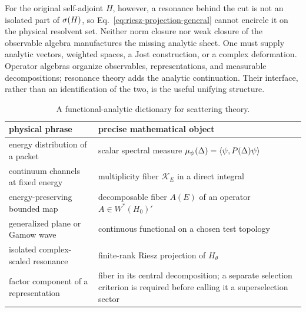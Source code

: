For the original self-adjoint $H$, however, a resonance behind the cut is not
an isolated part of $\sigma(H)$, so Eq.~\eqref{eq:riesz-projection-general}
cannot encircle it on the physical resolvent set.  Neither norm closure nor
weak closure of the observable algebra manufactures the missing analytic
sheet.  One must supply analytic vectors, weighted spaces, a Jost construction,
or a complex deformation.  Operator algebras organize observables,
representations, and measurable decompositions; resonance theory adds the
analytic continuation.  Their interface, rather than an identification of the
two, is the useful unifying structure.

\begin{table}[t]
  \centering
  \small
  \begin{tabular}{>{\raggedright\arraybackslash}p{}
                  >{\raggedright\arraybackslash}p{}}
    \toprule
    physical phrase & precise mathematical object \\
    \midrule
    energy distribution of a packet & scalar spectral measure
    $\mu_\psi(\Delta)=\langle \psi,P(\Delta)\psi\rangle$ \\
    \addlinespace
    continuum channels at fixed energy & multiplicity fiber
    $\mathcal K_E$ in a direct integral \\
    \addlinespace
    energy-preserving bounded map & decomposable fiber $A(E)$ of an operator
    $A\in W^*(H_0)'$ \\
    \addlinespace
    generalized plane or Gamow wave & continuous functional on a chosen test
    topology \\
    \addlinespace
    isolated complex-scaled resonance & finite-rank Riesz projection of
    $H_\theta$ \\
    \addlinespace
    factor component of a representation & fiber in its central
    decomposition; a separate selection criterion is required before calling
    it a superselection sector \\
    \bottomrule
  \end{tabular}
  \caption{A functional-analytic dictionary for scattering theory.}
  \label{tab:functional-dictionary}
\end{table}

